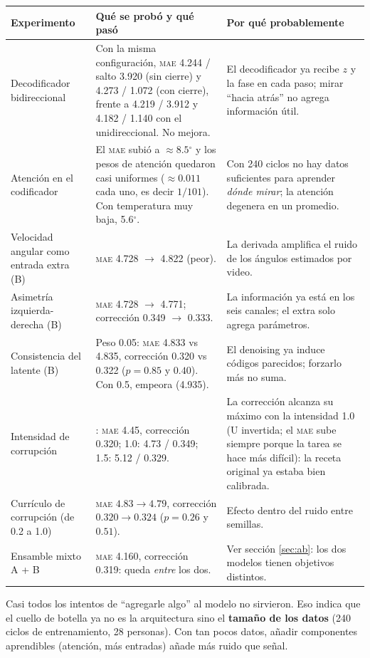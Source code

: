 \documentclass[11pt,a4paper]{article}
\newcommand{\gr}{$^\circ$}
\newcommand{\mae}{\textsc{mae}}
\begin{document}
\begin{tabularx}{\textwidth}{@{}>{\raggedright\arraybackslash}p{3.3cm}>{\raggedright\arraybackslash}X>{\raggedright\arraybackslash}p{4.5cm}@{}}
\toprule
\textbf{Experimento} & \textbf{Qué se probó y qué pasó} & \textbf{Por qué probablemente} \\
\midrule
Decodificador bidireccional & Con la misma configuración, \mae{} 4.244 / salto 3.920 (sin cierre) y 4.273 / 1.072 (con cierre), frente a 4.219 / 3.912 y 4.182 / 1.140 con el unidireccional. No mejora. & El decodificador ya recibe $z$ y la fase en cada paso; mirar ``hacia atrás'' no agrega información útil. \\
Atención en el codificador & El \mae{} subió a $\approx8.5$\gr{} y los pesos de atención quedaron casi uniformes ($\approx 0.011$ cada uno, es decir $1/101$). Con temperatura muy baja, 5.6\gr. & Con 240 ciclos no hay datos suficientes para aprender \emph{dónde mirar}; la atención degenera en un promedio. \\
Velocidad angular como entrada extra (B) & \mae{} 4.728 $\to$ 4.822 (peor). & La derivada amplifica el ruido de los ángulos estimados por video. \\
Asimetría izquierda-derecha (B) & \mae{} 4.728 $\to$ 4.771; corrección 0.349 $\to$ 0.333. & La información ya está en los seis canales; el extra solo agrega parámetros. \\
Consistencia del latente (B) & Peso 0.05: \mae{} 4.833 vs 4.835, corrección 0.320 vs 0.322 ($p=0.85$ y $0.40$). Con 0.5, empeora (4.935). & El denoising ya induce códigos parecidos; forzarlo más no suma. \\
Intensidad de corrupción & 0.5: \mae{} 4.45, corrección 0.320; 1.0: 4.73 / 0.349; 1.5: 5.12 / 0.329. & La corrección alcanza su máximo con la intensidad 1.0 (U invertida; el \mae{} sube siempre porque la tarea se hace más difícil): la receta original ya estaba bien calibrada. \\
Currículo de corrupción (de 0.2 a 1.0) & \mae{} $4.83\to4.79$, corrección $0.320\to0.324$ ($p=0.26$ y $0.51$). & Efecto dentro del ruido entre semillas. \\
Ensamble mixto A + B & \mae{} 4.160, corrección 0.319: queda \emph{entre} los dos. & Ver sección \ref{sec:ab}: los dos modelos tienen objetivos distintos. \\
\bottomrule
\end{tabularx}

\begin{intuicion}
Casi todos los intentos de ``agregarle algo'' al modelo no sirvieron. Eso indica que el cuello de botella ya no es la arquitectura sino el \textbf{tamaño de los datos} (240 ciclos de entrenamiento, 28 personas). Con tan pocos datos, añadir componentes aprendibles (atención, más entradas) añade más ruido que señal.
\end{intuicion}
\end{document}
